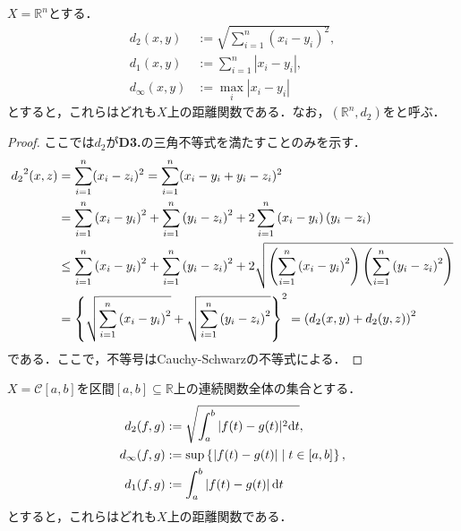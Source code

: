 \documentclass[uplatex]{jsarticle}
\begin{document}
\begin{rei}
    $X = \mathbb{R}^{n}$とする．
    \begin{align}
        d_{2} (x,y) &:= \sqrt{\sum_{i=1}^{n} (x_{i} - y_{i})^{2}}, \\
        d_{1} (x,y) &:= \sum_{i=1}^{n} |x_{i} - y_{i}|, \\
        d_{\infty} (x,y) &:= \max_{i} |x_{i} - y_{i}|
    \end{align}
    とすると，これらはどれも$X$上の距離関数である．なお，$(\mathbb{R}^{n}, d_{2})$をと呼ぶ．
\end{rei}
\begin{proof}
    ここでは$d_{2}$が\textbf{D3.}の三角不等式を満たすことのみを示す．
    \begin{align*}
        {d_{2}}^{2}(x,z)
        &= \sum_{i=1}^{n} (x_{i} - z_{i})^{2} = \sum_{i=1}^{n} (x_{i} - y_{i} + y_{i} - z_{i})^{2} \notag \\
        &= \sum_{i=1}^{n} \left( x_{i} - y_{i} \right)^{2} + \sum_{i=1}^{n} \left( y_{i} - z_{i} \right)^{2} + 2 \sum_{i=1}^{n} \left( x_{i} - y_{i} \right) \left( y_{i} - z_{i} \right) \notag \\
      &\le \sum_{i=1}^{n} \left( x_{i} - y_{i} \right)^{2} + \sum_{i=1}^{n} \left( y_{i} - z_{i} \right)^{2} + 2 \sqrt{\left( \sum_{i=1}^{n} \left( x_{i} - y_{i} \right)^{2} \right) \left( \sum_{i=1}^{n} \left( y_{i} - z_{i} \right)^{2} \right)} \\
        &= \left\{ \sqrt{\sum_{i=1}^{n} \left( x_{i} - y_{i} \right)^{2}} + \sqrt{\sum_{i=1}^{n} \left( y_{i} - z_{i} \right)^{2}} \right\}^{2}
         = \left( d_{2}(x,y) + d_{2} (y,z) \right)^{2}
    \end{align*}
    である．ここで，不等号はCauchy-Schwarzの不等式による．
\end{proof}

\begin{rei}
    $X = \mathcal{C} [a,b]$を区間$[a,b] \subseteq \mathbb{R}$上の連続関数全体の集合とする．
    \begin{align}
        d_{2} (f,g) &:= \sqrt{ \int_{a}^{b} | f(t) - g(t) | ^{2} \mathrm{d}t}, \\
        d_{\infty} (f,g) &:= \sup \Set{\hspace{-1.8pt}  \left| f(t) - g(t) \right| | t \in [a,b] \hspace{-1.8pt}}, \\
        d_{1} (f,g) &:= \int_{a}^{b} \left| f(t) - g(t) \right| \mathrm{d}t
    \end{align}
    とすると，これらはどれも$X$上の距離関数である．
\end{rei}
\end{document}
